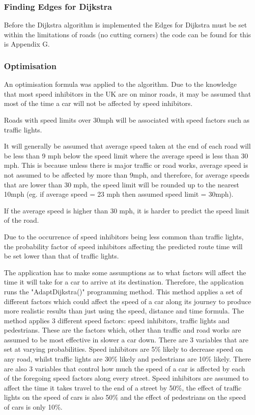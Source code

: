 \documentclass[12pt,a4paper]{article}
\begin{document}
\subsubsection{Finding Edges for Dijkstra}
Before the Dijkstra algorithm is implemented the Edges for Dijkstra must be set within the limitations of roads (no cutting corners) the code can be found for this is Appendix G.


\subsubsection{Optimisation}

An optimisation formula was applied to the algorithm. Due to the knowledge that most speed inhibitors in the UK are on minor roads, it may be assumed that most of the time a car will not be affected by speed inhibitors.

Roads with speed limits over 30mph will be associated with speed factors such as traffic lights.

It will generally be assumed that average speed taken at the end of each road will be less than 9 mph below the speed limit where the average speed is less than 30 mph. This is because unless there is major traffic or road works, average speed is not assumed to be affected by more than 9mph, and therefore, for average speeds that are lower than 30 mph, the speed limit will be rounded up to the nearest 10mph (eg. if average speed = 23 mph then assumed speed limit = 30mph).

If the average speed is higher than 30 mph, it is harder to predict the speed limit of the road.

Due to the occurrence of speed inhibitors being less common than traffic lights, the probability factor of speed inhibitors affecting the predicted route time will be set lower than that of traffic lights.

 The application has to make some assumptions as to what factors will affect the time it will take for a car to arrive at its destination. Therefore, the application runs the "AdaptDijkstra()" programming method. This method applies a set of different factors which could affect the speed of a car along its journey to produce more realistic results than just using the speed, distance and time formula. The method applies 3 different speed factors: speed inhibitors, traffic lights and pedestrians. These are the factors which, other than traffic and road works are assumed to be most effective in slower a car down. There are 3 variables that are set at varying probabilities. Speed inhibitors are 5\% likely to decrease speed on any road, whilst traffic lights are 30\% likely and pedestrians are 10\% likely. There are also 3 variables that control how much the speed of a car is affected by each of the foregoing speed factors along every street. Speed inhibitors are assumed to affect the time it takes travel to the end of a street by 50\%, the effect of traffic lights on the speed of cars is also 50\% and the effect of pedestrians on the speed of cars is only 10\%.
\end{document}
